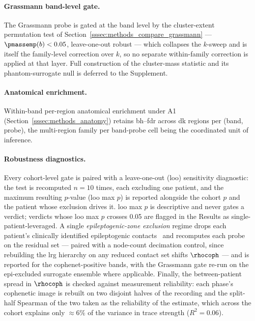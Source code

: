 \paragraph{Grassmann band-level gate.}
The Grassmann probe is gated at the band level by the cluster-extent permutation test of Section~\ref{sssec:methods_compare_grassmann} --- \(\pmassemp(b) < 0.05\), leave-one-out robust --- which collapses the \(k\)-sweep and is itself the family-level correction over \(k\), so no separate within-family correction is applied at that layer. Full construction of the cluster-mass statistic and its phantom-surrogate null is deferred to the Supplement.

\paragraph{Anatomical enrichment.}
Within-band per-region anatomical enrichment under A1 (Section~\ref{sssec:methods_anatomy}) retains \gls{bh}--\gls{fdr} across \acrshort{dk} regions per (band, probe), the multi-region family per band-probe cell being the coordinated unit of inference.

\paragraph{Robustness diagnostics.}
Every cohort-level gate is paired with a leave-one-out (\gls{loo}) sensitivity diagnostic: the test is recomputed \(n = 10\) times, each excluding one patient, and the maximum resulting \(p\)-value (\gls{loo} max \(p\)) is reported alongside the cohort \(p\) and the patient whose exclusion drives it. \gls{loo} max \(p\) is descriptive and never gates a verdict; verdicts whose \gls{loo} max \(p\) crosses \num{0.05} are flagged in the Results as single-patient-leveraged. A single \emph{epileptogenic-zone exclusion} regime drops each patient's clinically identified epileptogenic contacts~\cite{cardinale2013stereoelectroencephalography} and recomputes each probe on the residual set --- paired with a node-count decimation control, since rebuilding the \gls{lrg} hierarchy on any reduced contact set shifts \(\rhocoph\) --- and is reported for the cophenet-positive bands, with the Grassmann gate re-run on the epi-excluded surrogate ensemble where applicable. Finally, the between-patient spread in \(\rhocoph\) is checked against measurement reliability: each phase's cophenetic image is rebuilt on two disjoint halves of the recording and the split-half Spearman of the two taken as the reliability of the estimate, which across the cohort explains only \(\approx\!6\%\) of the variance in trace strength (\(R^{2} = 0.06\)).



